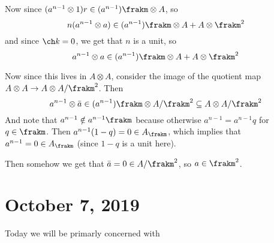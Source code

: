 \documentclass[12pt]{article}
\begin{document}
\begin{prf}
	Now since $(a^{n-1}\otimes 1)r\in (a^{n-1})\frakm\otimes A$, so 
	\[n(a^{n-1}\otimes a)\in (a^{n-1})\frakm\otimes A+A\otimes\frakm^2\]
	and since $\ch k=0$, we get that $n$ is a unit, so 
	\[a^{n-1}\otimes a\in (a^{n-1})\frakm\otimes A+A\otimes\frakm^2\]

	Now since this lives in $A\otimes A$, consider the image of the quotient map $A\otimes A\to A\otimes A/\frakm^2$. Then 
	\[a^{n-1}\otimes\bar a\in (a^{n-1})\frakm\otimes A/\frakm^2\subseteq A\otimes A/\frakm^2\]
	And note that $a^{n-1}\notin a^{n-1}\frakm$ because otherwise $a^{n-1}=a^{n-1}q$ for $q\in \frakm$.
	Then $a^{n-1}(1-q)=0\in A_\frakm$, which implies that $a^{n-1}=0\in A_\frakm$ (since $1-q$ is a unit here).

	Then somehow we get that $\bar a=0\in A/\frakm^2$, so $a\in \frakm^2$.
\end{prf}

\section{October 7, 2019}
Today we will be primarly concerned with 
\end{document}
